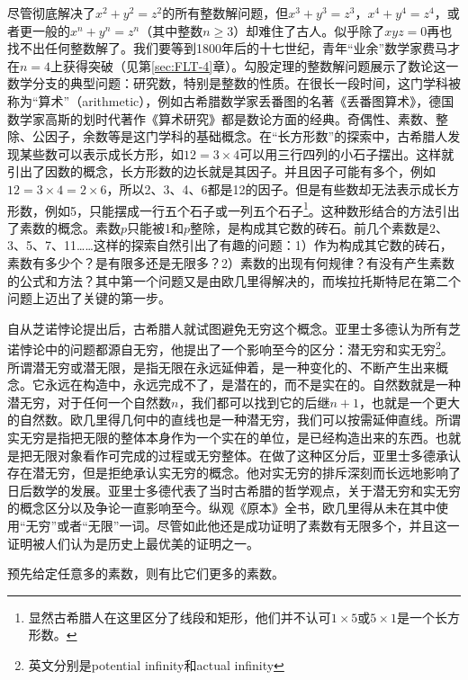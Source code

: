 \documentclass[b5paper]{ctexart}
\begin{document}

尽管彻底解决了$x^2 + y^2 = z^2$的所有整数解问题，但$x^3 + y^3 = z^3$，$x^4 + y^4 = z^4$，或者更一般的$x^n + y^n = z^n$（其中整数$n \geq 3$）却难住了古人。似乎除了$xyz = 0$再也找不出任何整数解了。我们要等到1800年后的十七世纪，青年“业余”数学家费马才在$n = 4$上获得突破（见第\ref{sec:FLT-4}章）。勾股定理的整数解问题展示了数论这一数学分支的典型问题：研究数，特别是整数的性质。在很长一段时间，这门学科被称为“算术”（arithmetic），例如古希腊数学家丢番图的名著《丢番图算术》，德国数学家高斯的划时代著作《算术研究》都是数论方面的经典。奇偶性、素数、整除、公因子，余数等是这门学科的基础概念。在“长方形数”的探索中，古希腊人发现某些数可以表示成长方形，如$12 = 3 \times 4$可以用三行四列的小石子摆出。这样就引出了因数的概念，长方形数的边长就是其因子。并且因子可能有多个，例如$12 = 3 \times 4 = 2 \times 6$，所以2、3、4、6都是12的因子。但是有些数却无法表示成长方形数，例如5，只能摆成一行五个石子或一列五个石子\footnote{显然古希腊人在这里区分了线段和矩形，他们并不认可$1 \times 5$或$5 \times 1$是一个长方形数。}。这种数形结合的方法引出了素数的概念。素数$p$只能被1和$p$整除，是构成其它数的砖石。前几个素数是2、3、5、7、11……这样的探索自然引出了有趣的问题：1）作为构成其它数的砖石，素数有多少个？是有限多还是无限多？2）素数的出现有何规律？有没有产生素数的公式和方法？其中第一个问题又是由欧几里得解决的，而埃拉托斯特尼在第二个问题上迈出了关键的第一步。

自从芝诺悖论提出后，古希腊人就试图避免无穷这个概念。亚里士多德认为所有芝诺悖论中的问题都源自无穷，他提出了一个影响至今的区分：潜无穷和实无穷\footnote{英文分别是potential infinity和actual infinity}。所谓潜无穷或潜无限，是指无限在永远延伸着，是一种变化的、不断产生出来概念。它永远在构造中，永远完成不了，是潜在的，而不是实在的。自然数就是一种潜无穷，对于任何一个自然数$n$，我们都可以找到它的后继$n + 1$，也就是一个更大的自然数。欧几里得几何中的直线也是一种潜无穷，我们可以按需延伸直线。所谓实无穷是指把无限的整体本身作为一个实在的单位，是已经构造出来的东西。也就是把无限对象看作可完成的过程或无穷整体。在做了这种区分后，亚里士多德承认存在潜无穷，但是拒绝承认实无穷的概念。他对实无穷的排斥深刻而长远地影响了日后数学的发展\cite{HanXueTao16}。亚里士多德代表了当时古希腊的哲学观点，关于潜无穷和实无穷的概念区分以及争论一直影响至今。纵观《原本》全书，欧几里得从未在其中使用“无穷”或者“无限”一词。尽管如此他还是成功证明了素数有无限多个，并且这一证明被人们认为是历史上最优美的证明之一。

\begin{theorem}
预先给定任意多的素数，则有比它们更多的素数。
\end{theorem}
\end{document}
